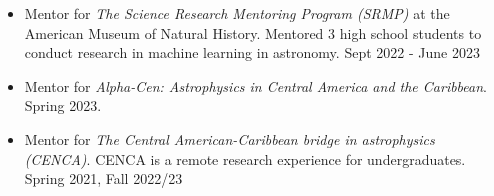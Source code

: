 \documentclass[letterpaper,10pt]{article}
\begin{document}
  
  \begin{itemize}[label=$\blacktriangleright$]
  
  \item Mentor for \emph{The Science Research Mentoring Program (SRMP)} at the American Museum of Natural History. Mentored 3 high school students to conduct research in machine learning in astronomy. Sept 2022 - June 2023

          \item Mentor for \emph{Alpha-Cen: Astrophysics in Central America and the Caribbean}. Spring 2023.

   \item Mentor for \emph{The Central American-Caribbean bridge in astrophysics (CENCA)}. CENCA is a remote research experience for undergraduates. Spring 2021, Fall 2022/23
\end{itemize}
  
  \begin{comment}
  
\begin{itemize}[label=$\blacktriangleright$]

	\item \emph{Graduate Part-Time Instructor} PHYS 1403/1404: Algebra-based, Inquiry-based, Laboratory-based Introductory Physics Curriculum. TTU, 2017-Present.  
	
	

	
\item \emph{Teaching Assistant.}  PHYS 1401/2401: Principles of Physics I/II. Lead the laboratories and discussions for the calculus based introductory physics. TTU, 2016-2017.  
  	  

  \item \emph{Undergraduate Teaching Fellow.}  PHYS 2215: Physics for Scientists and Engineers Lab I -  Utah State, Fall 2013.
  
  
  
  
 
  
  
  \end{itemize}
  
  
  
  
  
  
  
  
  




\end{comment}
\end{document}
